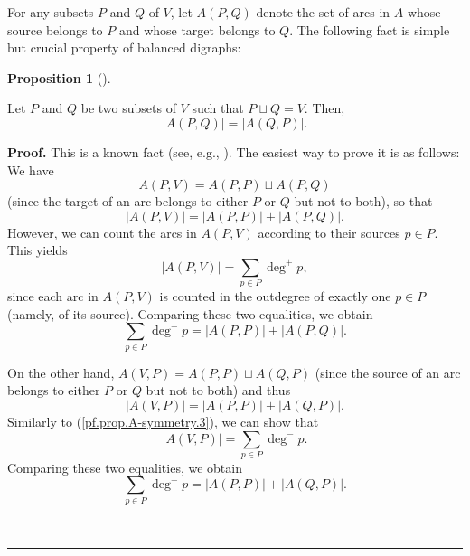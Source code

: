 \documentclass[numbers=enddot,12pt,final,onecolumn,notitlepage]{scrartcl}%
\theoremstyle{definition}
\newtheorem{prop}[theo]{Proposition}
\newenvironment{proposition}[1][]
{\begin{prop}[#1]\begin{leftbar}}
{\end{leftbar}\end{prop}}
\newenvironment{proof}[1][Proof]{\noindent\textbf{#1.} }{\ \rule{0.5em}{0.5em}}
\let\sumnonlimits\sum
\renewcommand{\sum}{\sumnonlimits\limits}
\theoremstyle{plainsl}
\begin{document}
For any subsets $P$ and $Q$ of $V$, let $A(P,Q)$ denote the set of arcs in $A$
whose source belongs to $P$ and whose target belongs to $Q$. The following
fact is simple but crucial property of balanced digraphs:

\begin{proposition}
\label{prop.A-symmetry}Let $P$ and $Q$ be two subsets of $V$ such that
$P\sqcup Q=V$. Then,
\[
\left\vert A\left(  P,Q\right)  \right\vert =\left\vert A\left(  Q,P\right)
\right\vert .
\]

\end{proposition}

\begin{proof}
This is a known fact (see, e.g., \cite[Exercise 9.1]{22s}). The easiest way to
prove it is as follows: We have%
\[
A\left(  P,V\right)  =A\left(  P,P\right)  \sqcup A\left(  P,Q\right)
\]
(since the target of an arc belongs to either $P$ or $Q$ but not to both), so
that%
\[
\left\vert A\left(  P,V\right)  \right\vert =\left\vert A\left(  P,P\right)
\right\vert +\left\vert A\left(  P,Q\right)  \right\vert .
\]
However, we can count the arcs in $A\left(  P,V\right)  $ according to their
sources $p\in P$. This yields%
\begin{equation}
\left\vert A\left(  P,V\right)  \right\vert =\sum_{p\in P}\deg^{+}p,
\label{pf.prop.A-symmetry.3}%
\end{equation}
since each arc in $A\left(  P,V\right)  $ is counted in the outdegree of
exactly one $p\in P$ (namely, of its source). Comparing these two equalities,
we obtain%
\begin{equation}
\sum_{p\in P}\deg^{+}p=\left\vert A\left(  P,P\right)  \right\vert +\left\vert
A\left(  P,Q\right)  \right\vert . \label{pf.prop.A-symmetry.4}%
\end{equation}


On the other hand, $A\left(  V,P\right)  =A\left(  P,P\right)  \sqcup A\left(
Q,P\right)  $ (since the source of an arc belongs to either $P$ or $Q$ but not
to both) and thus%
\[
\left\vert A\left(  V,P\right)  \right\vert =\left\vert A\left(  P,P\right)
\right\vert +\left\vert A\left(  Q,P\right)  \right\vert .
\]
Similarly to (\ref{pf.prop.A-symmetry.3}), we can show that%
\[
\left\vert A\left(  V,P\right)  \right\vert =\sum_{p\in P}\deg^{-}p.
\]
Comparing these two equalities, we obtain%
\begin{equation}
\sum_{p\in P}\deg^{-}p=\left\vert A\left(  P,P\right)  \right\vert +\left\vert
A\left(  Q,P\right)  \right\vert . \label{pf.prop.A-symmetry.5}%
\end{equation}



\end{proof}
\end{document}

